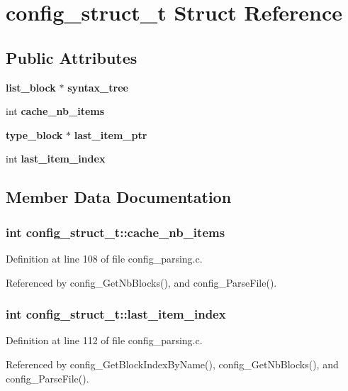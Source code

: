 \section{config\_\-struct\_\-t Struct Reference}
\label{structconfig__struct__t}
\subsection*{Public Attributes}
\begin{CompactItemize}
\item 
{\bf list\_\-block} $\ast$ {\bf syntax\_\-tree}
\item 
int {\bf cache\_\-nb\_\-items}
\item 
{\bf type\_\-block} $\ast$ {\bf last\_\-item\_\-ptr}
\item 
int {\bf last\_\-item\_\-index}
\end{CompactItemize}


\subsection{Member Data Documentation}
\subsubsection{\setlength{\rightskip}{0pt plus 5cm}int {\bf config\_\-struct\_\-t::cache\_\-nb\_\-items}}\label{structconfig__struct__t_o1}




Definition at line 108 of file config\_\-parsing.c.

Referenced by config\_\-Get\-Nb\-Blocks(), and config\_\-Parse\-File().
\subsubsection{\setlength{\rightskip}{0pt plus 5cm}int {\bf config\_\-struct\_\-t::last\_\-item\_\-index}}\label{structconfig__struct__t_o3}




Definition at line 112 of file config\_\-parsing.c.

Referenced by config\_\-Get\-Block\-Index\-By\-Name(), config\_\-Get\-Nb\-Blocks(), and config\_\-Parse\-File().
